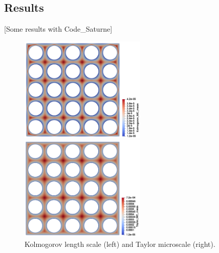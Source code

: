 \documentclass[11pt,letterpaper,english]{article}
\begin{document}
\subsection{Results}

[Some results with Code\_Saturne]

\begin{figure}
\begin{minipage}{0.50\linewidth}
  \begin{center}
    \includegraphics[height = 50mm]{./Figures/ss_thimble/cs_ss_thimble_kolmogorov_mean.png}
    \caption{Kolmogorov length scale (left) and Taylor microscale (right).}
  \end{center}
\end{minipage}\hfill
\begin{minipage}{0.50\linewidth}
   \begin{center}
    \includegraphics[height = 50mm]{./Figures/ss_thimble/ss_thimble_taylor_mean.png}
   \end{center}
\end{minipage}
\end{figure}
\end{document}
